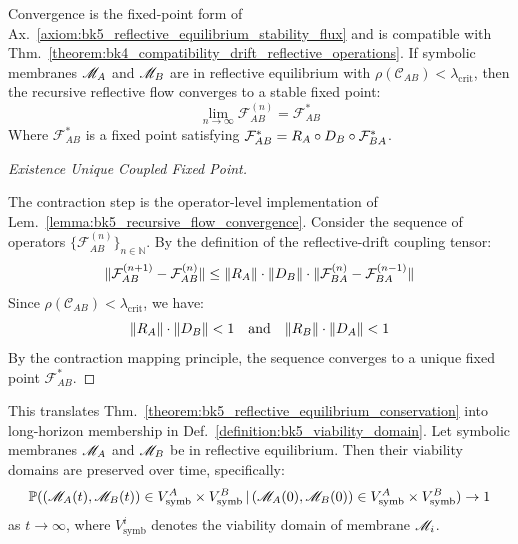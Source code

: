 \begin{lemma}
\label{lemma:bk5_recursive_flow_convergence}
Convergence is the fixed-point form of Ax.~\ref{axiom:bk5_reflective_equilibrium_stability_flux} and is compatible with Thm.~\ref{theorem:bk4_compatibility_drift_reflective_operations}.
If symbolic membranes $\mathscr{M}_A$ and $\mathscr{M}_B$ are in reflective equilibrium with $\rho(\mathcal{C}_{AB}) < \lambda_{\text{crit}}$, then the recursive reflective flow converges to a stable fixed point:
\begin{equation}
\lim_{n \to \infty} \mathcal{F}_{AB}^{(n)} = \mathcal{F}_{AB}^*
\end{equation}
Where $\mathcal{F}_{AB}^*$ is a fixed point satisfying $\mathcal{F}_{AB}^* = R_A \circ D_B \circ \mathcal{F}_{BA}^*$.
\end{lemma}
\begin{proof}[Existence Unique Coupled Fixed Point]
\label{proof:bk5_existence_unique_coupled_fixed_point}
\leavevmode

The contraction step is the operator-level implementation of Lem.~\ref{lemma:bk5_recursive_flow_convergence}.
Consider the sequence of operators $\{\mathcal{F}_{AB}^{(n)}\}_{n \in \mathbb{N}}$. By the definition of the reflective-drift coupling tensor:
\begin{equation}
\|\mathcal{F}_{AB}^{(n+1)} - \mathcal{F}_{AB}^{(n)}\| \leq \|R_A\| \cdot \|D_B\| \cdot \|\mathcal{F}_{BA}^{(n)} - \mathcal{F}_{BA}^{(n-1)}\|
\end{equation}
Since $\rho(\mathcal{C}_{AB}) < \lambda_{\text{crit}}$, we have:
\begin{equation}
\|R_A\| \cdot \|D_B\| < 1 \quad \text{and} \quad \|R_B\| \cdot \|D_A\| < 1
\end{equation}
By the contraction mapping principle, the sequence converges to a unique fixed point $\mathcal{F}_{AB}^*$.
\end{proof}
\begin{proposition}
\label{proposition:bk5_viability_domain_preservation}
This translates Thm.~\ref{theorem:bk5_reflective_equilibrium_conservation} into long-horizon membership in Def.~\ref{definition:bk5_viability_domain}.
Let symbolic membranes $\mathscr{M}_A$ and $\mathscr{M}_B$ be in reflective equilibrium. Then their viability domains are preserved over time, specifically:
\begin{equation}
\mathbb{P}((\mathscr{M}_A(t), \mathscr{M}_B(t)) \in V_{\text{symb}}^A \times V_{\text{symb}}^B \,|\, (\mathscr{M}_A(0), \mathscr{M}_B(0)) \in V_{\text{symb}}^A \times V_{\text{symb}}^B) \to 1
\end{equation}
as $t \to \infty$, where $V_{\text{symb}}^i$ denotes the viability domain of membrane $\mathscr{M}_i$.
\end{proposition}
